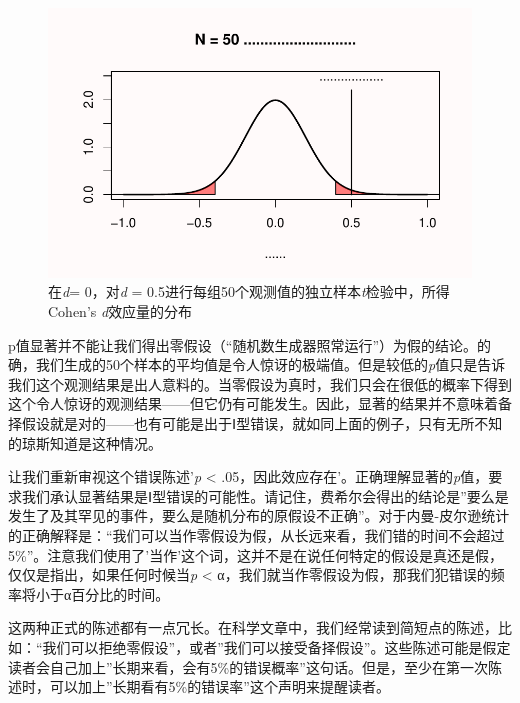 \documentclass[
  letterpaper,
  DIV=11,
  numbers=noendperiod]{scrreprt}
\begin{document}
\begin{figure}

{\centering \includegraphics[width=1\textwidth,height=\textheight]{01-pvalue_files/figure-pdf/fig-fig137-1.pdf}

}

\caption{\label{fig-fig137}在\emph{d}= 0，对\emph{d} =
0.5进行每组50个观测值的独立样本\emph{t}检验中，所得Cohen's
\emph{d}效应量的分布}

\end{figure}

p值显著并不能让我们得出零假设（``随机数生成器照常运行''）为假的结论。的确，我们生成的50个样本的平均值是令人惊讶的极端值。但是较低的\emph{p}值只是告诉我们这个观测结果是出人意料的。当零假设为真时，我们只会在很低的概率下得到这个令人惊讶的观测结果------但它仍有可能发生。因此，显著的结果并不意味着备择假设就是对的------也有可能是出于Ⅰ型错误，就如同上面的例子，只有无所不知的琼斯知道是这种情况。

让我们重新审视这个错误陈述'\emph{p} \textless{}
.05，因此效应存在'。正确理解显著的\emph{p}值，要求我们承认显著结果是Ⅰ型错误的可能性。请记住，费希尔会得出的结论是''要么是发生了及其罕见的事件，要么是随机分布的原假设不正确''。对于内曼-皮尔逊统计的正确解释是：``我们可以当作零假设为假，从长远来看，我们错的时间不会超过5\%''。注意我们使用了'当作'这个词，这并不是在说任何特定的假设是真还是假，仅仅是指出，如果任何时候当\emph{p}
\textless{}
α，我们就当作零假设为假，那我们犯错误的频率将小于α百分比的时间。

这两种正式的陈述都有一点冗长。在科学文章中，我们经常读到简短点的陈述，比如：``我们可以拒绝零假设''，或者''我们可以接受备择假设''。这些陈述可能是假定读者会自己加上''长期来看，会有5\%的错误概率''这句话。但是，至少在第一次陈述时，可以加上''长期看有5\%的错误率''这个声明来提醒读者。
\end{document}
